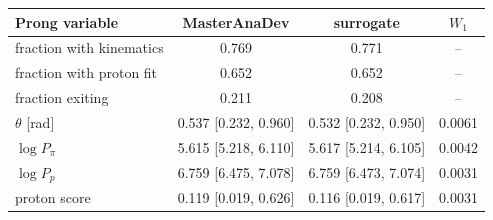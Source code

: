 \begin{tabular}{lccc}
\toprule
Prong variable & MasterAnaDev & surrogate & $W_1$ \\
\midrule
fraction with kinematics & 0.769 & 0.771 & -- \\
fraction with proton fit & 0.652 & 0.652 & -- \\
fraction exiting & 0.211 & 0.208 & -- \\
$\theta$ [rad] & 0.537 [0.232, 0.960] & 0.532 [0.232, 0.950] & 0.0061 \\
$\log P_\pi$ & 5.615 [5.218, 6.110] & 5.617 [5.214, 6.105] & 0.0042 \\
$\log P_p$ & 6.759 [6.475, 7.078] & 6.759 [6.473, 7.074] & 0.0031 \\
proton score & 0.119 [0.019, 0.626] & 0.116 [0.019, 0.617] & 0.0031 \\
\bottomrule
\end{tabular}
